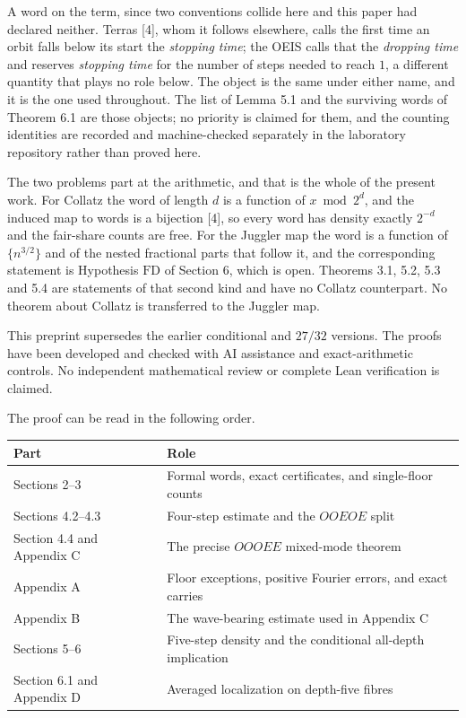 \documentclass[11pt,a4paper]{article}
\begin{document}
A word on the term, since two conventions collide here and this paper
had declared neither. Terras {[}4{]}, whom it follows elsewhere, calls
the first time an orbit falls below its start the \emph{stopping time};
the OEIS calls that the \emph{dropping time} and reserves \emph{stopping
time} for the number of steps needed to reach \(1\), a different
quantity that plays no role below. The object is the same under either
name, and it is the one used throughout. The list of Lemma 5.1 and the
surviving words of Theorem 6.1 are those objects; no priority is claimed
for them, and the counting identities are recorded and machine-checked
separately in the laboratory repository rather than proved here.

The two problems part at the arithmetic, and that is the whole of the
present work. For Collatz the word of length \(d\) is a function of
\(x\bmod2^d\), and the induced map to words is a bijection {[}4{]}, so
every word has density exactly \(2^{-d}\) and the fair-share counts are
free. For the Juggler map the word is a function of \(\{n^{3/2}\}\) and
of the nested fractional parts that follow it, and the corresponding
statement is Hypothesis \(\mathrm{FD}\) of Section 6, which is open.
Theorems 3.1, 5.2, 5.3 and 5.4 are statements of that second kind and
have no Collatz counterpart. No theorem about Collatz is transferred to
the Juggler map.

This preprint supersedes the earlier conditional and \(27/32\) versions.
The proofs have been developed and checked with AI assistance and
exact-arithmetic controls. No independent mathematical review or
complete Lean verification is claimed.

The proof can be read in the following order.

\begingroup\small

\begin{longtable}[]{@{}
  >{\raggedright\arraybackslash}p{}
  >{\raggedright\arraybackslash}p{}@{}}
\toprule\noalign{}
\begin{minipage}[b]{\linewidth}\raggedright
Part
\end{minipage} & \begin{minipage}[b]{\linewidth}\raggedright
Role
\end{minipage} \\
\midrule\noalign{}
\endhead
\bottomrule\noalign{}
\endlastfoot
Sections 2--3 & Formal words, exact certificates, and single-floor
counts \\
Sections 4.2--4.3 & Four-step estimate and the \(OOEOE\) split \\
Section 4.4 and Appendix C & The precise \(OOOEE\) mixed-mode theorem \\
Appendix A & Floor exceptions, positive Fourier errors, and exact
carries \\
Appendix B & The wave-bearing estimate used in Appendix C \\
Sections 5--6 & Five-step density and the conditional all-depth
implication \\
Section 6.1 and Appendix D & Averaged localization on depth-five
fibres \\
\end{longtable}
\end{document}
